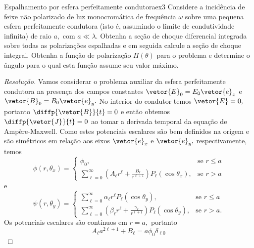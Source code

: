 \begin{exercício}{Espalhamento por esfera perfeitamente condutora}{ex3}
   Considere a incidência de feixe não polarizado de luz monocromática de frequência \(\omega\)  sobre uma pequena esfera perfeitamente condutora (isto é, assumindo o limite de condutividade infinita) de raio \(a,\) com \(a \ll \lambda.\) Obtenha a seção de choque diferencial integrada sobre todas as polarizações espalhadas e em seguida calcule a seção de choque integral. Obtenha a função de polarização \(\Pi(\theta)\) para o problema e determine o ângulo para o qual esta função assume seu valor máximo.
\end{exercício}
\begin{proof}[Resolução]
   Vamos considerar o problema auxiliar da esfera perfeitamente condutora na presença dos campos constantes \(\vetor{E}_0 = E_0\vetor{e}_x\) e \(\vetor{B}_0 = B_0\vetor{e}_y.\) No interior do condutor temos \(\vetor{E} = 0,\) portanto \(\diffp{\vetor{B}}{t} = 0\) e então obtemos \(\diffp{\vetor{J}}{t} = 0\) ao tomar a derivada temporal da equação de Ampère-Maxwell. \todo[Podemos então escrever \(H = - \nabla\psi\) e \(\vetor{E} = - \nabla \phi\) com \(\psi\) e \(\phi\) satisfazendo a equação de Laplace dentro e fora da esfera.] Como estes potenciais escalares são bem definidos na origem e são simétricos em relação aos eixos \(\vetor{e}_x\) e \(\vetor{e}_y,\) respectivamente, temos
   \begin{equation*}
      \phi(r,\theta_x) = \begin{cases}
         \phi_0,&\text{se }r \leq a\\
         \sum_{\ell = 0}^\infty \left(A_\ell r^\ell + \frac{B_\ell}{r^{\ell + 1}}\right)P_\ell(\cos\theta_x),&\text{se }r > a
      \end{cases}
   \end{equation*}
   e
   \begin{equation*}
      \psi(r,\theta_y) = \begin{cases}
         \sum_{\ell = 0}^\infty \alpha_\ell r^\ell P_\ell(\cos\theta_y),&\text{se }r \leq a\\
         \sum_{\ell = 0}^\infty \left(\beta_\ell r^\ell + \frac{\gamma_\ell}{r^{\ell + 1}}\right)P_\ell(\cos\theta_y),&\text{se }r > a.
      \end{cases}
   \end{equation*}
   Os potenciais escalares são contínuos em \(r = a,\) portanto
   \begin{equation*}
      A_\ell a^{2\ell + 1} + B_\ell = a\phi_0 \delta_{\ell 0}

\end{equation*}
\end{proof}
